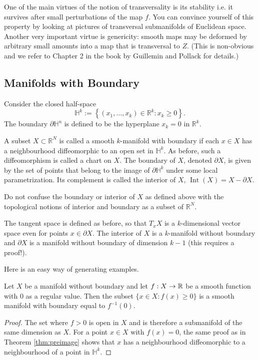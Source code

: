 \documentclass[a4paper]{scrartcl}
\begin{document}
One of the main virtues of the notion of transversality is its stability i.e. it survives after small perturbations of the map $f$. You can convince yourself of this property by looking at pictures of transversal submanifolds of Euclidean space. Another very important virtue is genericity: smooth maps may be deformed by arbitrary small amounts into a map that is transversal to $Z$. (This is non-obvious and we refer to Chapter 2 in the book by Guillemin and Pollack for details.)

\subsection{Manifolds with Boundary}

Consider the closed half-space
$$
\mathbb{H}^{k}:=\left\{\left(x_{1}, \ldots, x_{k}\right) \in \mathbb{R}^{k}: x_{k} \geq 0\right\}.
$$
The boundary $\partial \mathbb{H}^{n}$ is defined to be the hyperplane $x_{k}=0$ in $\mathbb{R}^{k}$.

\begin{definition}
    A subset $X \subset \mathbb{R}^{N}$ is called a smooth $k$-manifold with boundary if each $x \in X$ has a neighbourhood diffeomorphic to an open set in $\mathbb{H}^{k}$. As before, such a diffeomorphism is called a chart on $X$. The boundary of $X$, denoted $\partial X$, is given by the set of points that belong to the image of $\partial \mathbb{H}^{k}$ under some local parametrization. Its complement is called the interior of $X$, $\operatorname{Int}(X)=X-\partial X$.
\end{definition}

\begin{remark}[Warning]
    Do not confuse the boundary or interior of $X$ as defined above with the topological notions of interior and boundary as a subset of $\mathbb{R}^{N}$.
\end{remark}


The tangent space is defined as before, so that $T_{x} X$ is a $k$-dimensional vector space even for points $x \in \partial X$. The interior of $X$ is a $k$-manifold without boundary and $\partial X$ is a manifold without boundary of dimension $k-1$ (this requires a proof!).

Here is an easy way of generating examples.

\begin{lemma}\label{lem:sublevel}
    Let $X$ be a manifold without boundary and let $f: X \rightarrow \mathbb{R}$ be a smooth function with $0$ as a regular value. Then the subset $\{x \in X: f(x) \geq 0\}$ is a smooth manifold with boundary equal to $f^{-1}(0)$.
\end{lemma}
\begin{proof}
    The set where $f>0$ is open in $X$ and is therefore a submanifold of the same dimension as $X$. For a point $x \in X$ with $f(x)=0$, the same proof as in Theorem \ref{thm:preimage} shows that $x$ has a neighbourhood diffeomorphic to a neighbourhood of a point in $\mathbb{H}^{k}$.
\end{proof}
\end{document}
